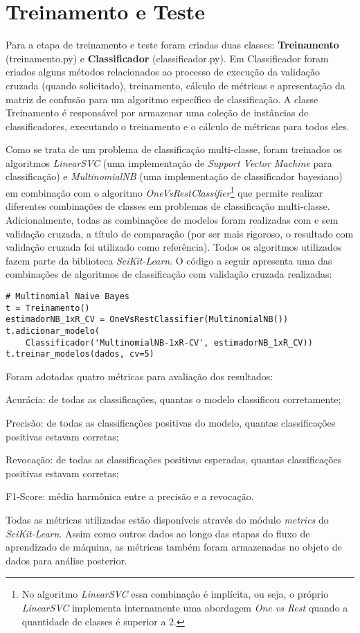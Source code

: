 \section{Treinamento e Teste}

Para a etapa de treinamento e teste foram criadas duas classes: \textbf{Treinamento} (treinamento.py) e \textbf{Classificador} (classificador.py). Em Classificador foram criados alguns  métodos relacionados ao processo de execução da validação cruzada (quando solicitado), treinamento, cálculo de métricas e apresentação da matriz de confusão para um algoritmo específico de classificação. A classe Treinamento é responsável por armazenar uma coleção de instâncias de classificadores, executando o treinamento e o cálculo de métricas para todos eles.

Como se trata de um problema de classificação multi-classe, foram treinados os algoritmos \textit{LinearSVC} (uma implementação de \textit{Support Vector Machine} para classificação) e \textit{MultinomialNB} (uma implementação de classificador bayesiano) em combinação com o algoritmo \textit{OneVsRestClassifier}\footnote{No algoritmo \textit{LinearSVC} essa combinação é implícita, ou seja, o próprio \textit{LinearSVC} implementa internamente uma abordagem \textit{One vs Rest} quando a quantidade de classes é superior a 2.} que permite realizar diferentes combinações de classes em problemas de classificação multi-classe. Adicionalmente, todas as combinações de modelos foram realizadas com e sem validação cruzada, a título de comparação (por ser mais rigoroso, o resultado com validação cruzada foi utilizado como referência). Todos os algoritmos utilizados fazem parte da biblioteca \textit{SciKit-Learn}. O código a seguir apresenta uma das combinações de algoritmos de classificação com validação cruzada realizadas:

\begin{lstlisting}
# Multinomial Naive Bayes 
t = Treinamento()
estimadorNB_1xR_CV = OneVsRestClassifier(MultinomialNB())
t.adicionar_modelo(
	Classificador('MultinomialNB-1xR-CV', estimadorNB_1xR_CV))
t.treinar_modelos(dados, cv=5)
\end{lstlisting}

Foram adotadas quatro métricas para avaliação dos resultados: 
\begin{alineas}
	\item Acurácia: de todas as classificações, quantas o modelo classificou corretamente;
	\item Precisão: de todas as classificações positivas do modelo, quantas classificações positivas estavam corretas;
	\item Revocação: de todas as classificações positivas esperadas, quantas classificações positivas estavam corretas;
	\item  F1-Score: média harmônica entre a precisão e a revocação.
\end{alineas}

Todas as métricas utilizadas estão disponíveis através do módulo \textit{metrics} do \textit{SciKit-Learn}. Assim como outros dados ao longo das etapas do fluxo de aprendizado de máquina, as métricas também foram armazenadas no objeto de dados para análise posterior. 